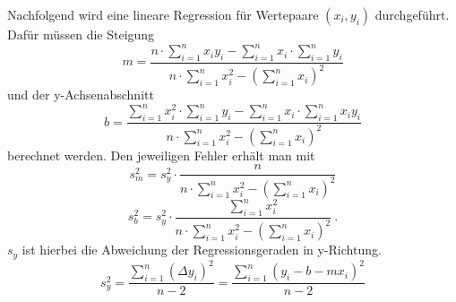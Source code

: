 Nachfolgend wird eine lineare Regression für Wertepaare $(x_i,y_i)$ durchgeführt. Dafür müssen die Steigung
\begin{equation}
	m = \dfrac{
		n\cdot\sum\limits_{i=1}^nx_iy_i-\sum\limits_{i=1}^nx_i\cdot\sum\limits_{i=1}^ny_i
		}
		{n\cdot\sum\limits_{i=1}^nx_i^2-\left(\sum\limits_{i=1}^nx_i\right)^2
		}
\end{equation}
und der y-Achsenabschnitt
\begin{equation}
	b = \dfrac{
		\sum\limits_{i=1}^nx_i^2\cdot\sum\limits_{i=1}^ny_i-\sum\limits_{i=1}^nx_i\cdot\sum\limits_{i=1}^nx_iy_i
		}{
		n\cdot\sum\limits_{i=1}^nx_i^2-\left(\sum\limits_{i=1}^nx_i\right)^2
		}
\end{equation}
berechnet werden. Den jeweiligen Fehler erhält man mit
\begin{equation}
	s_m^2 = s_y^2 \cdot \dfrac{n}{n\cdot\sum\limits_{i=1}^nx_i^2-\left(\sum\limits_{i=1}^nx_i\right)^2}
\end{equation}
\begin{equation}
	s_b^2 = s_y^2 \cdot \dfrac{\sum\limits_{i=1}^nx_i^2}{n\cdot\sum\limits_{i=1}^nx_i^2-\left(\sum\limits_{i=1}^nx_i\right)^2}\ .
\end{equation}
$s_y$ ist hierbei die Abweichung der Regressionsgeraden in y-Richtung.
\begin{equation}
	s_y^2 = \dfrac{\sum\limits_{i=1}^n\left(\Delta y_i\right)^2}{n-2} = \dfrac{\sum\limits_{i=1}^n\left(y_i-b-mx_i\right)^2}{n-2}
\end{equation}